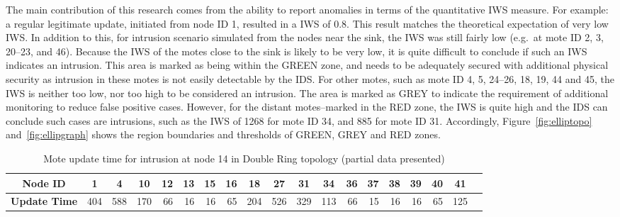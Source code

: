 \documentclass{CRPITStyle}
\newcommand*{\bd}[1]{\multicolumn{1}{|c|}{\bfseries #1}}
\begin{document}
The main contribution of this research comes from the ability to report anomalies in terms of the quantitative IWS measure.
For example:  a regular legitimate update, initiated from node ID 1, resulted in a IWS of 0.8.
This result matches the theoretical expectation of very low IWS.
In addition to this, for intrusion scenario simulated from the nodes near the sink, the IWS was still fairly low (e.g.\ at mote ID 2, 3, 20--23, and 46). 
Because the IWS of the motes close to the sink is likely to be very low, it is quite difficult to conclude if such an IWS indicates an intrusion.
This area is marked as being within the GREEN zone, and needs to be adequately secured with additional physical security as intrusion in these motes is not easily detectable by the IDS.
For other motes, such as mote ID 4, 5, 24--26, 18, 19, 44 and 45, the IWS is neither too low, nor too high to be considered an intrusion. The area is marked as GREY to indicate the requirement of additional monitoring to reduce false positive cases.
However, for the distant motes--marked in the RED zone, the IWS is quite high and the IDS can conclude such cases are intrusions, such as the IWS of 1268 for mote ID 34, and 885 for mote ID 31. %
Accordingly, Figure~\ref{fig:elliptopo} and~\ref{fig:ellipgraph} shows the region boundaries and thresholds of GREEN, GREY and RED zones.%

\begin{table}[t]
\centering
\begin{tabular}{|l|*{17}{r|}r|}
\hline
\bd{Node ID}           & \bd{1} & \bd{4} & \bd{10} & \bd{12} & \bd{13} & \bd{15} & \bd{16} & \bd{18} & \bd{27} & \bd{31} & \bd{34} & \bd{36} & \bd{37} & \bd{38} & \bd{39} & \bd{40} & \bd{41} \\%
\hline
\bd{Update Time}  &   404 	&  588 	& 170 	& 66 	& 16 &	 16 	& 65 &	 204 &	 526 & 329 &	 113 &	 66 &	 15 	& 16 	& 16 &	 65 &	125 \\%
\hline
\end{tabular}
\caption{Mote update time for intrusion at node 14 in Double Ring topology (partial data presented)}

\label{tab:dr_time_14}
\end{table}
\end{document}
